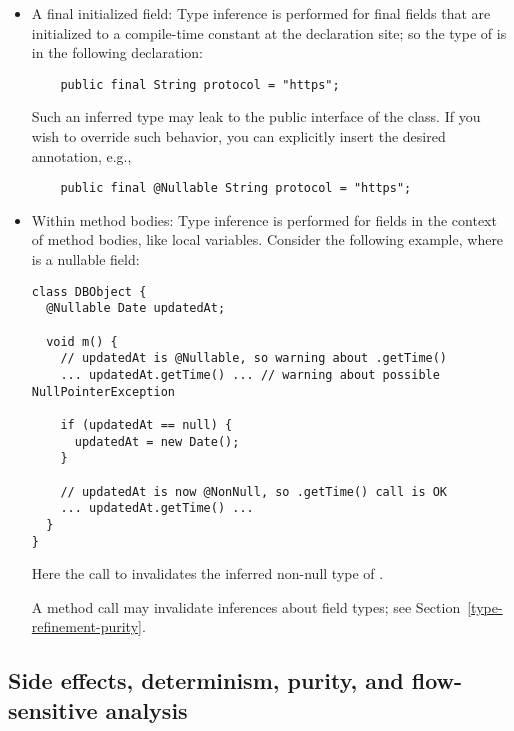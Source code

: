 \begin{itemize}

\item
A final initialized field:
Type inference is performed for final fields that are initialized to a
compile-time constant at the declaration site; so the type of 
is  in the following declaration:

\begin{Verbatim}
    public final String protocol = "https";
\end{Verbatim}

Such an inferred type may leak to the public interface of the class.
If you wish to override such behavior, you can explicitly insert the desired
annotation, e.g.,

\begin{Verbatim}
    public final @Nullable String protocol = "https";
\end{Verbatim}

\item
Within method bodies:
Type inference is performed for fields in the context of method bodies,
like local variables.
Consider the following example, where  is a nullable
field:

\begin{Verbatim}
class DBObject {
  @Nullable Date updatedAt;

  void m() {
    // updatedAt is @Nullable, so warning about .getTime()
    ... updatedAt.getTime() ... // warning about possible NullPointerException

    if (updatedAt == null) {
      updatedAt = new Date();
    }

    // updatedAt is now @NonNull, so .getTime() call is OK
    ... updatedAt.getTime() ...
  }
}
\end{Verbatim}

Here the call to  invalidates the inferred non-null type
of .

A method call may invalidate inferences about field types; see
Section~\ref{type-refinement-purity}.

\end{itemize}


\subsection{Side effects, determinism, purity, and flow-sensitive analysis\label{type-refinement-purity}}

